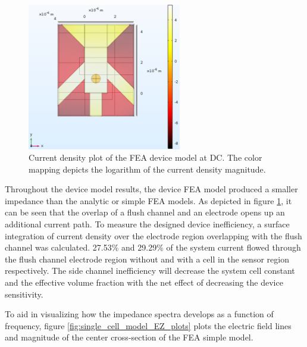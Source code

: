 \begin{figure}[H]
    \centering
    \includegraphics[width=0.6\textwidth]{images/deviceCellCurrent1Hz.png}
    \caption[Current density plot of the FEA device model.]{Current density plot of the FEA device model at DC. The color mapping depicts the logarithm of the current density magnitude.}
    \label{fig:device_current_denisty plot}
\end{figure}

\par Throughout the device model results, the device FEA model produced a smaller impedance than the analytic or simple FEA models. As depicted in figure \ref{fig:device_current_denisty plot}, it can be seen that the overlap of a flush channel and an electrode opens up an additional current path. To measure the designed device inefficiency, a surface integration of current density over the electrode region overlapping with the flush channel was calculated. 27.53\% and 29.29\% of the system current flowed through the flush channel electrode region without and with a cell in the sensor region respectively. The side channel inefficiency will decrease the system cell constant and the effective volume fraction with the net effect of decreasing the device sensitivity.

\par To aid in visualizing how the impedance spectra develops as a function of frequency, figure \ref{fig:single_cell_model_EZ_plots} plots the electric field lines and magnitude of the center cross-section of the FEA simple model.

